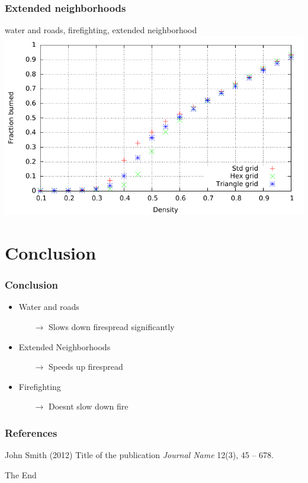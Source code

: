 \documentclass{beamer}
\begin{document}
\begin{frame}
\frametitle{Extended neighborhoods}
water and roads, firefighting, extended neighborhood
\centering
\includegraphics[width=\textwidth]{imgs/plot/ex6/fracburned.pdf}
\end{frame}
\section{Conclusion} 

\begin{frame}
\frametitle{Conclusion}
\begin{itemize}
\item{Water and roads}
\pause 
\begin{itemize}
\item[$\rightarrow$] Slows down firespread significantly
\end{itemize}
\pause 
\item{Extended Neighborhoods}
\pause 
\begin{itemize}
\item[$\rightarrow$]  Speeds up firespread
\end{itemize}
\pause
\item{Firefighting}
\pause 
\begin{itemize}
\item[$\rightarrow$]  Doesnt slow down fire
\end{itemize}
\end{itemize}
\end{frame}



\begin{frame}
\frametitle{References}
\footnotesize{
\begin{thebibliography}{99} %
 John Smith (2012)
\newblock Title of the publication
\newblock \emph{Journal Name} 12(3), 45 -- 678.
\end{thebibliography}
}
\end{frame}


\begin{frame}
\Huge{\centerline{The End}}
\end{frame}

\end{document}
